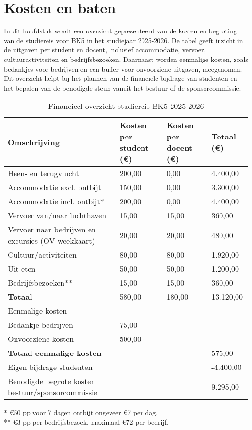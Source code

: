 \section{Kosten en baten}

In dit hoofdstuk wordt een overzicht gepresenteerd van de kosten en begroting van de studiereis voor BK5 in het studiejaar 2025-2026. De tabel geeft inzicht in de uitgaven per student en docent, inclusief accommodatie, vervoer, cultuuractiviteiten en bedrijfsbezoeken. Daarnaast worden eenmalige kosten, zoals bedankjes voor bedrijven en een buffer voor onvoorziene uitgaven, meegenomen. Dit overzicht helpt bij het plannen van de financiële bijdrage van studenten en het bepalen van de benodigde steun vanuit het bestuur of de sponsorcommissie.

\begin{table}[h!]
	\centering
	\caption{Financieel overzicht studiereis BK5 2025-2026}
	\label{tab:financien}
	\begin{tabular}{|l|l|l|l|}
		\hline
		\textbf{Omschrijving} & \textbf{Kosten per student (€)} & \textbf{Kosten per docent (€)} & \textbf{Totaal (€)} \\
		\hline
		Heen- en terugvlucht & 200,00 & 0,00 & 4.400,00 \\
		\hline
		Accommodatie excl. ontbijt & 150,00 & 0,00 & 3.300,00 \\
		\hline
		Accommodatie incl. ontbijt* & 200,00 & 0,00 & 4.400,00 \\
		\hline
		Vervoer van/naar luchthaven & 15,00 & 15,00 & 360,00 \\
		\hline
		Vervoer naar bedrijven en excursies (OV weekkaart) & 20,00 & 20,00 & 480,00 \\
		\hline
		Cultuur/activiteiten & 80,00 & 80,00 & 1.920,00 \\
		\hline
		Uit eten & 50,00 & 50,00 & 1.200,00 \\
		\hline
		Bedrijfsbezoeken** & 15,00 & 15,00 & 360,00 \\
		\hline
		\textbf{Totaal} & 580,00 & 180,00 & 13.120,00 \\
		\hline
		Eenmalige kosten & & & \\
		\hline
		Bedankje bedrijven & 75,00 & & \\
		\hline
		Onvoorziene kosten & 500,00 & & \\
		\hline
		\textbf{Totaal eenmalige kosten} & & & 575,00 \\
		\hline
		Eigen bijdrage studenten & & & -4.400,00 \\
		\hline
		Benodigde begrote kosten bestuur/sponsorcommissie & & & 9.295,00 \\
		\hline
	\end{tabular}
	
	\vspace{0.5em}
	\footnotesize{* €50 pp voor 7 dagen ontbijt ongeveer €7 per dag. \\
		** €3 pp per bedrijfsbezoek, maximaal €72 per bedrijf.}
\end{table}